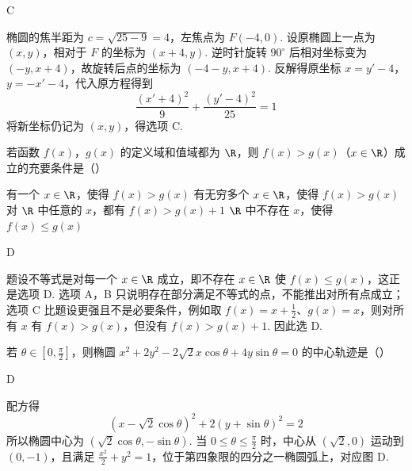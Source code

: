 \begin{answer}
C
\end{answer}

\begin{solution}
椭圆的焦半距为 \(c=\sqrt{25-9}=4\)，左焦点为 \(F(-4,0)\). 设原椭圆上一点为 \((x,y)\)，相对于 \(F\) 的坐标为 \((x+4,y)\). 逆时针旋转 \(90^\circ\) 后相对坐标变为 \((-y,x+4)\)，故旋转后点的坐标为 \((-4-y,x+4)\). 反解得原坐标 \(x=y'-4\)，\(y=-x'-4\)，代入原方程得到
\[
\frac{(x'+4)^2}{9}+\frac{(y'-4)^2}{25}=1
\]
将新坐标仍记为 \((x,y)\)，得选项 C.
\end{solution}

\begin{problem}
若函数 \(f(x)\)，\(g(x)\) 的定义域和值域都为 \(\R\)，则 \(f(x)>g(x)\)（\(x\in\R\)）成立的充要条件是（\quad）

\choices
    {有一个 \(x\in\R\)，使得 \(f(x)>g(x)\)}
    {有无穷多个 \(x\in\R\)，使得 \(f(x)>g(x)\)}
    {对 \(\R\) 中任意的 \(x\)，都有 \(f(x)>g(x)+1\)}
    {\(\R\) 中不存在 \(x\)，使得 \(f(x)\leqslant g(x)\)}
\end{problem}

\begin{answer}
D
\end{answer}

\begin{solution}
题设不等式是对每一个 \(x\in\R\) 成立，即不存在 \(x\in\R\) 使 \(f(x)\leqslant g(x)\)，这正是选项 D. 选项 A，B 只说明存在部分满足不等式的点，不能推出对所有点成立；选项 C 比题设更强且不是必要条件，例如取 \(f(x)=x+\frac{1}{2}\)、\(g(x)=x\)，则对所有 \(x\) 有 \(f(x)>g(x)\)，但没有 \(f(x)>g(x)+1\). 因此选 D.
\end{solution}

\begin{problem}
若 \(\theta\in\left[0,\frac{\pi}{2}\right]\)，则椭圆 \(x^2+2y^2-2\sqrt{2}x\cos\theta+4y\sin\theta=0\) 的中心轨迹是（\quad）

    {}
    {}
    {}
\end{problem}

\begin{answer}
D
\end{answer}

\begin{solution}
配方得
\[
\left(x-\sqrt{2}\cos\theta\right)^2+2\left(y+\sin\theta\right)^2=2
\]
所以椭圆中心为 \(\left(\sqrt{2}\cos\theta,-\sin\theta\right)\). 当 \(0\leqslant\theta\leqslant\frac{\pi}{2}\) 时，中心从 \((\sqrt{2},0)\) 运动到 \((0,-1)\)，且满足 \(\frac{x^2}{2}+y^2=1\)，位于第四象限的四分之一椭圆弧上，对应图 D.
\end{solution}

